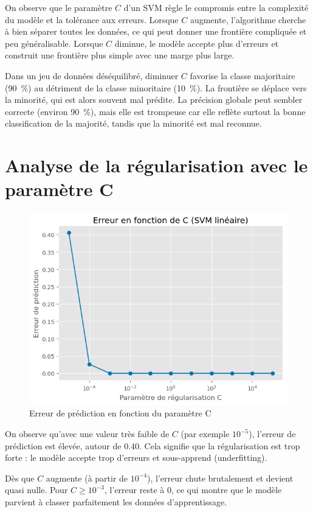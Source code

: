 \documentclass{rapport}
\begin{document}
On observe que le paramètre $C$ d’un SVM règle le compromis entre la complexité du modèle et la tolérance aux erreurs. 
Lorsque $C$ augmente, l’algorithme cherche à bien séparer toutes les données, ce qui peut donner une frontière compliquée et peu généralisable. 
Lorsque $C$ diminue, le modèle accepte plus d’erreurs et construit une frontière plus simple avec une marge plus large. 

Dans un jeu de données déséquilibré, diminuer $C$ favorise la classe majoritaire (90~\%) au détriment de la classe minoritaire (10~\%). 
La frontière se déplace vers la minorité, qui est alors souvent mal prédite. 
La précision globale peut sembler correcte (environ 90~\%), mais elle est trompeuse car elle reflète surtout la bonne classification de la majorité, tandis que la minorité est mal reconnue.




\section{Analyse de la régularisation avec le paramètre C}
\begin{figure}[H]
    \centering
    \includegraphics[width=0.75\linewidth]{logos/output.png}
    \caption{Erreur de prédiction en fonction du paramètre C}
    \label{fig:placeholderz}
\end{figure}


On observe qu’avec une valeur très faible de $C$ (par exemple $10^{-5}$), l’erreur de prédiction est élevée, autour de 0.40. Cela signifie que la régularisation est trop forte : le modèle accepte trop d’erreurs et sous-apprend (underfitting).

Dès que $C$ augmente (à partir de $10^{-4}$), l’erreur chute brutalement et devient quasi nulle. Pour $C \geq 10^{-3}$, l’erreur reste à 0, ce qui montre que le modèle parvient à classer parfaitement les données d’apprentissage.
\end{document}
